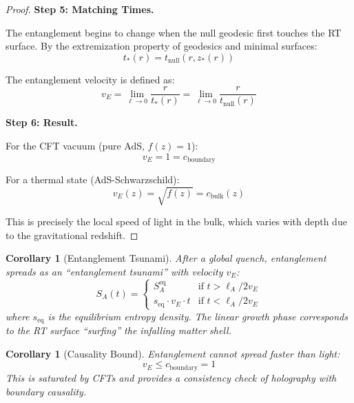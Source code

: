 \documentclass[12pt,a4paper]{article}
\newtheorem{corollary}[theorem]{Corollary}
\begin{document}
\begin{proof}
\textbf{Step 5: Matching Times.}

The entanglement begins to change when the null geodesic first touches the RT surface. By the extremization property of geodesics and minimal surfaces:
\begin{equation}
t_*(r) = t_{\text{null}}(r, z_*(r))
\end{equation}

The entanglement velocity is defined as:
\begin{equation}
v_E = \lim_{\ell \to 0} \frac{r}{t_*(r)} = \lim_{\ell \to 0} \frac{r}{t_{\text{null}}(r)}
\end{equation}

\textbf{Step 6: Result.}

For the CFT vacuum (pure AdS, $f(z) = 1$):
\begin{equation}
v_E = 1 = c_{\text{boundary}}
\end{equation}

For a thermal state (AdS-Schwarzschild):
\begin{equation}
v_E(z) = \sqrt{f(z)} = c_{\text{bulk}}(z)
\end{equation}

This is precisely the local speed of light in the bulk, which varies with depth due to the gravitational redshift.
\end{proof}

\begin{corollary}[Entanglement Tsunami]
After a global quench, entanglement spreads as an ``entanglement tsunami'' with velocity $v_E$:
\begin{equation}
S_A(t) = \begin{cases}
S_A^{\text{eq}} & \text{if } t > \ell_A / 2v_E \\
s_{\text{eq}} \cdot v_E \cdot t & \text{if } t < \ell_A / 2v_E
\end{cases}
\end{equation}
where $s_{\text{eq}}$ is the equilibrium entropy density. The linear growth phase corresponds to the RT surface ``surfing'' the infalling matter shell.
\end{corollary}

\begin{corollary}[Causality Bound]
Entanglement cannot spread faster than light:
\begin{equation}
v_E \leq c_{\text{boundary}} = 1
\end{equation}
This is saturated by CFTs and provides a consistency check of holography with boundary causality.
\end{corollary}
\end{document}
